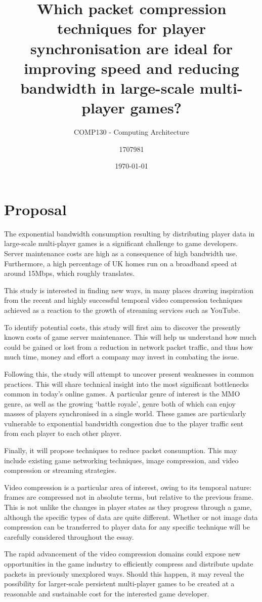 \documentclass{scrartcl}
\title{Which packet compression techniques for player synchronisation are ideal for improving speed and reducing bandwidth in large-scale multi-player games?}
\subtitle{COMP130 - Computing Architecture}
\date{\today}
\author{1707981}
\begin{document}
\maketitle
{}

\section{Proposal}
The exponential bandwidth consumption resulting by distributing player data in large-scale multi-player games is a significant challenge to game developers. Server maintenance costs are high as a consequence of high bandwidth use. Furthermore, a high percentage of UK homes run on a broadband speed at around 15Mbps, which roughly translates.

This study is interested in finding new ways, in many places drawing inspiration from the recent and highly successful temporal video compression techniques achieved as a reaction to the growth of streaming services such as YouTube.

To identify potential costs, this study will first aim to discover the presently known costs of game server maintenance. This will help us understand how much could be gained or lost from a reduction in network packet traffic, and thus how much time, money and effort a company may invest in combating the issue.

Following this, the study will attempt to uncover present weaknesses in common practices. This will share technical insight into the most significant bottlenecks common in today's online games. A particular genre of interest is the MMO genre, as well as the growing `battle royale', genre both of which can enjoy masses of players synchronised in a single world. These games are particularly vulnerable to exponential bandwidth congestion due to the player traffic sent from each player to each other player.

Finally, it will propose techniques to reduce packet consumption. This may include existing game networking techniques, image compression, and video compression or streaming strategies.

Video compression is a particular area of interest, owing to its temporal nature: frames are compressed not in absolute terms, but relative to the previous frame. This is not unlike the changes in player states as they progress through a game, although the specific types of data are quite different. Whether or not image data compression can be transferred to player data for any specific technique will be carefully considered throughout the essay.

The rapid advancement of the video compression domains could expose new opportunities in the game industry to efficiently compress and distribute update packets in previously unexplored ways. Should this happen, it may reveal the possibility for larger-scale persistent multi-player games to be created at a reasonable and sustainable cost for the interested game developer.

 

\end{document}
